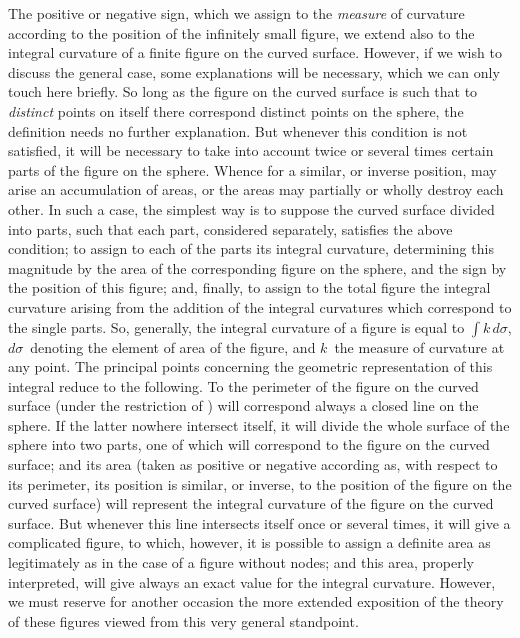 The positive or negative sign, which we assign to the \emph{measure} of curvature according
to the position of the infinitely small figure, we extend also to the integral curvature
of a finite figure on the curved surface. However, if we wish to discuss the general case,
some explanations will be necessary, which we can only touch here briefly. So long
as the figure on the curved surface is such that to \emph{distinct} points on itself there correspond
distinct points on the sphere, the definition needs no further explanation. But
whenever this condition is not satisfied, it will be necessary to take into account twice
or several times certain parts of the figure on the sphere. Whence for a similar, or
inverse position, may arise an accumulation of areas, or the areas may partially or
wholly destroy each other. In such a case, the simplest way is to suppose the curved
surface divided into parts, such that each part, considered separately, satisfies the above
condition; to assign to each of the parts its integral curvature, determining this magnitude
by the area of the corresponding figure on the sphere, and the sign by the position
of this figure; and, finally, to assign to the total figure the integral curvature
arising from the addition of the integral curvatures which correspond to the single parts.
So, generally, the integral curvature of a figure is equal to $\int k\, d\sigma$, $d\sigma$~denoting the
element of area of the figure, and $k$~the measure of curvature at any point. The principal
points concerning the geometric representation of this integral reduce to the following.
To the perimeter of the figure on the curved surface (under the restriction
of ) will correspond always a closed line on the sphere. If the latter nowhere
intersect itself, it will divide the whole surface of the sphere into two parts, one of
which will correspond to the figure on the curved surface; and its area (taken as
positive or negative according as, with respect to its perimeter, its position is similar,
or inverse, to the position of the figure on the curved surface) will represent the integral
curvature of the figure on the curved surface. But whenever this line intersects
itself once or several times, it will give a complicated figure, to which, however, it is
possible to assign a definite area as legitimately as in the case of a figure without
nodes; and this area, properly interpreted, will give always an exact value for the
integral curvature. However, we must reserve for another occasion the more extended
exposition of the theory of these figures viewed from this very general standpoint.


